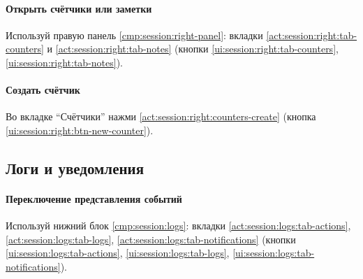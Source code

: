 \paragraph{Открыть счётчики или заметки}
Используй правую панель \ref{cmp:session:right-panel}: вкладки \ref{act:session:right:tab-counters} и \ref{act:session:right:tab-notes} (кнопки \ref{ui:session:right:tab-counters}, \ref{ui:session:right:tab-notes}). 

\paragraph{Создать счётчик}
Во вкладке ``Счётчики'' нажми \ref{act:session:right:counters-create} (кнопка \ref{ui:session:right:btn-new-counter}). 

\subsection{Логи и уведомления}

\paragraph{Переключение представления событий}
Используй нижний блок \ref{cmp:session:logs}: вкладки \ref{act:session:logs:tab-actions}, \ref{act:session:logs:tab-logs}, \ref{act:session:logs:tab-notifications} (кнопки \ref{ui:session:logs:tab-actions}, \ref{ui:session:logs:tab-logs}, \ref{ui:session:logs:tab-notifications}). 
